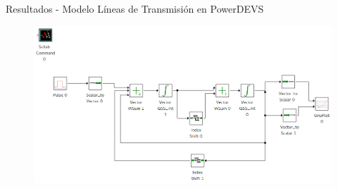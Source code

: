 \documentclass[10pt,handout]{beamer}
\begin{document}
\begin{frame}{Resultados - Modelo Líneas de Transmisión en PowerDEVS}
\begin{figure}[H]
 \includegraphics[width=\linewidth]{lclines}
\end{figure}
\end{frame}
\end{document}
